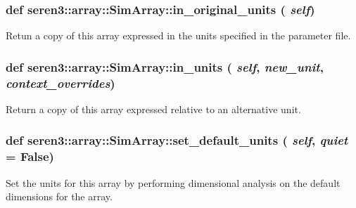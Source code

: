  \hypertarget{classseren3_1_1array_1_1SimArray_a52fb8aeb40ac9da1f71270e649d0d732}{
\subsubsection[{in\_\-original\_\-units}]{\setlength{\rightskip}{0pt plus 5cm}def seren3::array::SimArray::in\_\-original\_\-units ( {\em self})}}
\label{classseren3_1_1array_1_1SimArray_a52fb8aeb40ac9da1f71270e649d0d732}
\begin{DoxyVerb}Retun a copy of this array expressed in the units
specified in the parameter file.\end{DoxyVerb}
 \hypertarget{classseren3_1_1array_1_1SimArray_a79d5106c731558580604a24d21ed4fd6}{
\subsubsection[{in\_\-units}]{\setlength{\rightskip}{0pt plus 5cm}def seren3::array::SimArray::in\_\-units ( {\em self}, \/   {\em new\_\-unit}, \/   {\em context\_\-overrides})}}
\label{classseren3_1_1array_1_1SimArray_a79d5106c731558580604a24d21ed4fd6}
\begin{DoxyVerb}Return a copy of this array expressed relative to an alternative
unit.\end{DoxyVerb}
 \hypertarget{classseren3_1_1array_1_1SimArray_a316914d5943de0f36045af12612c4171}{
\subsubsection[{set\_\-default\_\-units}]{\setlength{\rightskip}{0pt plus 5cm}def seren3::array::SimArray::set\_\-default\_\-units ( {\em self}, \/   {\em quiet} = {\ttfamily False})}}
\label{classseren3_1_1array_1_1SimArray_a316914d5943de0f36045af12612c4171}
\begin{DoxyVerb}Set the units for this array by performing dimensional analysis
on the default dimensions for the array.\end{DoxyVerb}
